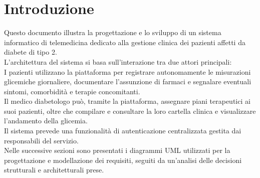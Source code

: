 \section{Introduzione}

Questo documento illustra la progettazione e lo sviluppo di un sistema informatico di telemedicina dedicato alla gestione clinica dei pazienti affetti da diabete di tipo 2.\\
L'architettura del sistema si basa sull'interazione tra due attori principali: \\
I pazienti utilizzano la piattaforma per registrare autonomamente le misurazioni glicemiche giornaliere, documentare l'assunzione di farmaci e segnalare eventuali sintomi, comorbidità e terapie concomitanti.\\
Il medico diabetologo può, tramite la piattaforma, assegnare piani terapeutici ai suoi pazienti, oltre che compilare e consultare la loro cartella clinica e visualizzare l'andamento della glicemia.\\
Il sistema prevede una funzionalità di autenticazione centralizzata gestita dai responsabili del servizio.\\

Nelle successive sezioni sono presentati i diagrammi UML utilizzati per la progettazione e modellazione dei requisiti, seguiti da un'analisi delle decisioni strutturali e architetturali prese.
